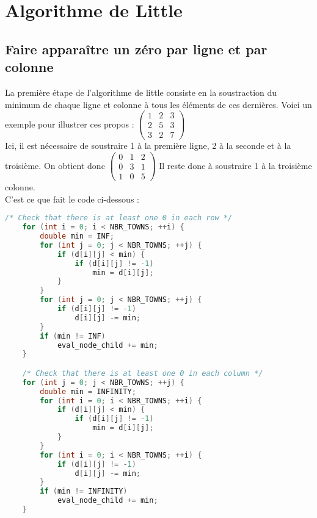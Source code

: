 \documentclass[a4paper]{article}
\begin{document}
\section{Algorithme de Little}

\subsection{Faire apparaître un zéro par ligne et par colonne}

La première étape de l'algorithme de little consiste en la soustraction du minimum de chaque ligne et colonne à tous les éléments de ces dernières. Voici un exemple pour illustrer ces propos :
$\begin{pmatrix}
1 & 2 & 3\\
2 & 5 & 3\\
3 & 2 & 7
\end{pmatrix}$\\


Ici, il est nécessaire de soustraire 1 à la première ligne, 2 à la seconde et à la troisième. On obtient donc 
$\begin{pmatrix}
0 & 1 & 2\\
0 & 3 & 1\\
1 & 0 & 5
\end{pmatrix}$
Il reste donc à soustraire 1 à la troisième colonne.\\

C'est ce que fait le code ci-dessous :

\begin{lstlisting}[language=C]
    /* Check that there is at least one 0 in each row */
    for (int i = 0; i < NBR_TOWNS; ++i) {
        double min = INF;
        for (int j = 0; j < NBR_TOWNS; ++j) {
            if (d[i][j] < min) {
                if (d[i][j] != -1)
                    min = d[i][j];
            }
        }
        for (int j = 0; j < NBR_TOWNS; ++j) {
            if (d[i][j] != -1)
                d[i][j] -= min;
        }
        if (min != INF)
            eval_node_child += min;
    }

    /* Check that there is at least one 0 in each column */
    for (int j = 0; j < NBR_TOWNS; ++j) {
        double min = INFINITY;
        for (int i = 0; i < NBR_TOWNS; ++i) {
            if (d[i][j] < min) {
                if (d[i][j] != -1)
                    min = d[i][j];
            }
        }
        for (int i = 0; i < NBR_TOWNS; ++i) {
            if (d[i][j] != -1)
                d[i][j] -= min;
        }
        if (min != INFINITY)
            eval_node_child += min;
    }
\end{lstlisting}
\end{document}
